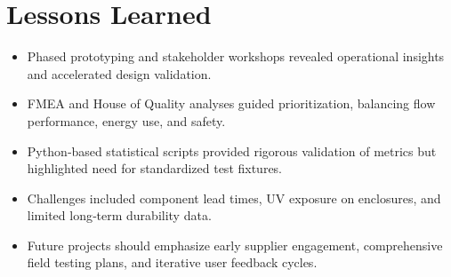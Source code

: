 \section{Lessons Learned}
\begin{itemize}
  \item Phased prototyping and stakeholder workshops revealed operational insights and accelerated design validation.
  \item FMEA and House of Quality analyses guided prioritization, balancing flow performance, energy use, and safety.
  \item Python‑based statistical scripts provided rigorous validation of metrics but highlighted need for standardized test fixtures.
  \item Challenges included component lead times, UV exposure on enclosures, and limited long‑term durability data.
  \item Future projects should emphasize early supplier engagement, comprehensive field testing plans, and iterative user feedback cycles.
\end{itemize}


